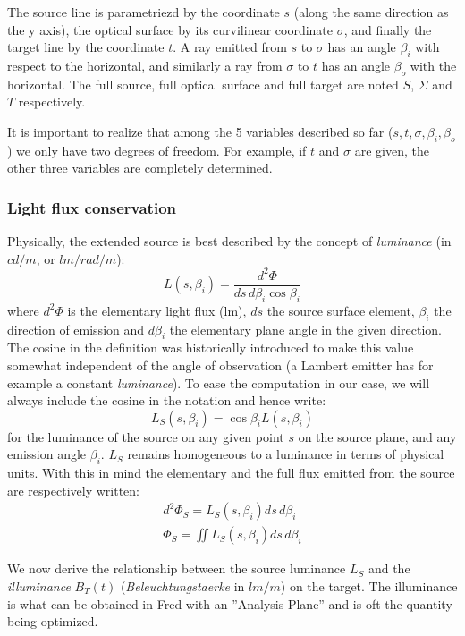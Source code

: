 The source line is parametriezd by the coordinate $s$ (along the same
direction as the y axis), the optical surface 
by its curvilinear coordinate $\sigma$, and finally the target
line by the coordinate $t$.
A ray emitted from $s$ to $\sigma$ has an angle $\beta_i$ with 
respect to the horizontal, and similarly a ray from $\sigma$ to
$t$ has an angle $\beta_o$ with the horizontal.
The full source, full optical surface and full target are noted
$S$, $\Sigma$ and $T$ respectively.

It is important to realize that among the 5 variables described so
far ($s,t, \sigma, \beta_i, \beta_o$) we only have two degrees
of freedom. For example, if $t$ and $\sigma$ are given, the other
three variables are completely determined.

\subsubsection*{Light flux conservation}

Physically, the extended source is best described by the concept
of \emph{luminance} (in $cd/m$, or $lm/rad/m$):
\[ L(s, \beta_i) = \frac{d^2\Phi}{ds\,d\beta_i \cos \beta_i}  \]
where $d^2\Phi$ is the elementary light flux (lm), $ds$ the source
surface element, $\beta_i$ the direction of emission and $d\beta_i$
the elementary plane angle in the given direction.
The cosine in the definition was historically introduced to make this
value somewhat independent of the angle of observation 
(a  Lambert emitter has for example a constant \emph{luminance}).
To ease the computation in our case, we will always include 
the cosine in the notation and hence
write:
\[ L_S (s, \beta_i) = \cos\beta_i L(s, \beta_i) \]
for the luminance of the source on any given point 
$s$ on the source plane, and any emission angle
$\beta_i$. $L_S$ remains homogeneous to a luminance in terms of 
physical units.
With this in mind the elementary and the full flux emitted 
from the source are respectively written:
\begin{eqnarray}
\label{eq:elem_src}
 d^2\Phi_S = L_S (s, \beta_i)ds\,d\beta_i \\
 \Phi_S = \iint L_S (s, \beta_i) ds\,d\beta_i
\end{eqnarray}

We now derive the relationship between the source luminance $L_S$
and the \emph{illuminance} $B_T(t)$ (\emph{Beleuchtungstaerke} in $lm/m$) 
on the target. The illuminance is what can be obtained in Fred 
with an ''Analysis Plane'' and is oft the quantity being
optimized.

